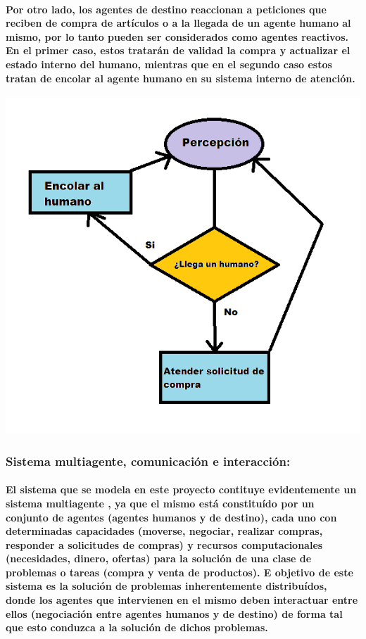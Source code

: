 \documentclass[12pt]{amsart}
\begin{document}
\paragraph{Por otro lado, los agentes de destino reaccionan a peticiones que reciben de compra de artículos o a la llegada de un agente humano al mismo, por lo tanto pueden ser considerados como agentes reactivos. En el primer caso, estos tratarán de validad la compra y actualizar el estado interno del humano, mientras que en el segundo caso estos tratan de encolar al agente humano en su sistema interno de atención.}

\begin{center}
	\includegraphics[scale=0.8]{./images/destalgo.png}
	\label{fig:destalgo}
\end{center}

\subsubsection{Sistema multiagente, comunicación e interacción:}

\paragraph{El sistema que se modela en este proyecto contituye evidentemente un sistema multiagente \cite{multiagent}, ya que el mismo está constituído por un conjunto de agentes (agentes humanos y de destino), cada uno con determinadas capacidades (moverse, negociar, realizar compras, responder a solicitudes de compras) y recursos computacionales (necesidades, dinero, ofertas) para la solución de una clase de problemas o tareas (compra y venta de productos). E objetivo de este sistema es la solución de problemas inherentemente distribuídos, donde los agentes que intervienen en el mismo deben interactuar entre ellos (negociación entre agentes humanos y de destino) de forma tal que esto conduzca a la solución de dichos problemas.}
\end{document}

